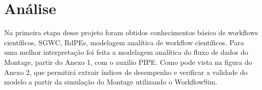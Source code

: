 \section{Análise}
	
	Na primeira etapa desse projeto foram obtidos conhecimentos básico de workflows científicos, SGWC, RdPEs, modelagem analítica de workflow científicos. Para uma melhor interpretação foi feita a modelagem analítica do fluxo de dados do Montage, partir do Anexo 1, \cite{pegasus:workflowgenerator} com o auxilio PIPE. Como pode vista na figura do Anexo 2, que permitirá extrair índices de desempenho e verificar a validade do modelo a partir da simulação do Montage utilizando o WorkflowSim.


